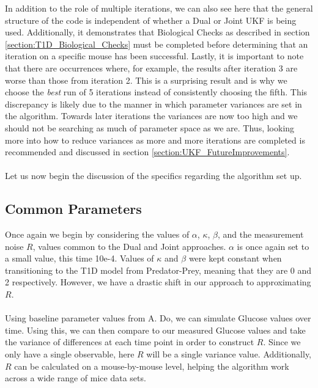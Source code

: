 \documentclass{article}
\begin{document}
In addition to the role of multiple iterations, we can also see here that the general structure of the code is independent of whether a Dual or Joint UKF is being used. Additionally, it demonstrates that Biological Checks as described in section \ref{section:T1D_Biological_Checks} must be completed before determining that an iteration on a specific mouse has been successful. Lastly, it is important to note that there are occurrences where, for example, the results after iteration 3 are worse than those from iteration 2. This is a surprising result and is why we choose the \emph{best} run of 5 iterations instead of consistently choosing the fifth. This discrepancy is likely due to the manner in which parameter variances are set in the algorithm. Towards later iterations the variances are now too high and we should not be searching as much of parameter space as we are. Thus, looking more into how to reduce variances as more and more iterations are completed is recommended and discussed in section \ref{section:UKF_FutureImprovements}.\\
\\
Let us now begin the discussion of the specifics regarding the algorithm set up.




\subsection{Common Parameters}
Once again we begin by considering the values of $\alpha$, $\kappa$, $\beta$, and the measurement noise $R$, values common to the Dual and Joint approaches. $\alpha$ is once again set to a small value, this time 10e-4. Values of $\kappa$ and $\beta$ were kept constant when transitioning to the T1D model from Predator-Prey, meaning that they are 0 and 2 respectively. However, we have a drastic shift in our approach to approximating $R$.\\
\\
Using baseline parameter values from A. Do, we can simulate Glucose values over time. Using this, we can then compare to our measured Glucose values and take the variance of differences at each time point in order to construct $R$. Since we only have a single observable, here $R$ will be a single variance value. Additionally, $R$ can be calculated on a mouse-by-mouse level, helping the algorithm work across a wide range of mice data sets.
\end{document}
